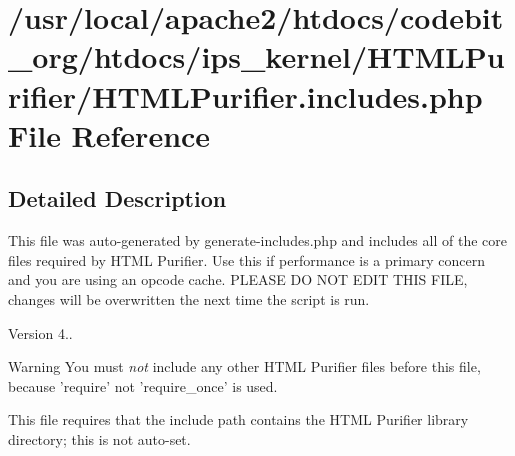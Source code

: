 \hypertarget{_h_t_m_l_purifier_8includes_8php}{\section{/usr/local/apache2/htdocs/codebit\-\_\-org/htdocs/ips\-\_\-kernel/\-H\-T\-M\-L\-Purifier/\-H\-T\-M\-L\-Purifier.includes.\-php File Reference}
\label{_h_t_m_l_purifier_8includes_8php}
}


\subsection{Detailed Description}
This file was auto-\/generated by generate-\/includes.\-php and includes all of the core files required by H\-T\-M\-L Purifier. Use this if performance is a primary concern and you are using an opcode cache. P\-L\-E\-A\-S\-E D\-O N\-O\-T E\-D\-I\-T T\-H\-I\-S F\-I\-L\-E, changes will be overwritten the next time the script is run.

\begin{DoxyVersion}{Version}
4..
\end{DoxyVersion}
\begin{DoxyWarning}{Warning}
You must {\itshape not} include any other H\-T\-M\-L Purifier files before this file, because 'require' not 'require\-\_\-once' is used.

This file requires that the include path contains the H\-T\-M\-L Purifier library directory; this is not auto-\/set. 
\end{DoxyWarning}
